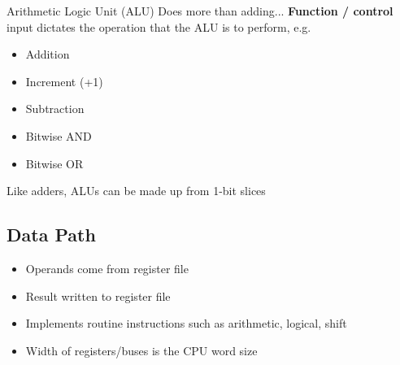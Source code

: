 \begin{note}{Arithmetic Logic Unit (ALU)}
Does more than adding... \textbf{Function / control} input dictates the operation that the ALU is to perform, e.g.
\begin{itemize}
	\item Addition
	\item Increment (+1)
	\item Subtraction
	\item Bitwise AND
	\item Bitwise OR	
\end{itemize}
Like adders, ALUs can be made up from 1-bit slices
\end{note}

\subsection{Data Path}
\begin{itemize}
	\item Operands come from register file
	\item Result written to register file
	\item Implements routine instructions such as arithmetic, logical, shift
	\item Width of registers/buses is the CPU word size	
\end{itemize}

